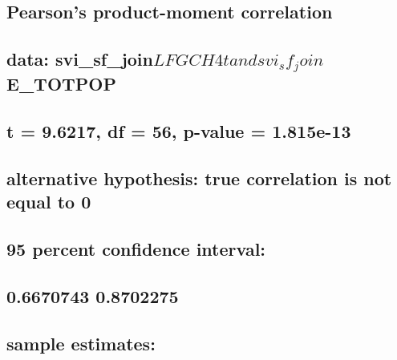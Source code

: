\documentclass[
  12pt,
]{article}
\begin{document}
\hypertarget{pearsons-product-moment-correlation-4}{%
\subsection{Pearson's product-moment
correlation}\label{pearsons-product-moment-correlation-4}}

\hypertarget{section-41}{%
\subsection{}\label{section-41}}

\hypertarget{data-svi_sf_joinlfgch4t-and-svi_sf_joine_totpop}{%
\subsection{\texorpdfstring{data:
svi\_sf\_join\(LFGCH4t and svi_sf_join\)E\_TOTPOP}{data: svi\_sf\_joinLFGCH4t and svi\_sf\_joinE\_TOTPOP}}\label{data-svi_sf_joinlfgch4t-and-svi_sf_joine_totpop}}

\hypertarget{t-9.6217-df-56-p-value-1.815e-13}{%
\subsection{t = 9.6217, df = 56, p-value =
1.815e-13}\label{t-9.6217-df-56-p-value-1.815e-13}}

\hypertarget{alternative-hypothesis-true-correlation-is-not-equal-to-0-4}{%
\subsection{alternative hypothesis: true correlation is not equal to
0}\label{alternative-hypothesis-true-correlation-is-not-equal-to-0-4}}

\hypertarget{percent-confidence-interval-4}{%
\subsection{95 percent confidence
interval:}\label{percent-confidence-interval-4}}

\hypertarget{section-42}{%
\subsection{0.6670743 0.8702275}\label{section-42}}

\hypertarget{sample-estimates-4}{%
\subsection{sample estimates:}\label{sample-estimates-4}}
\end{document}
